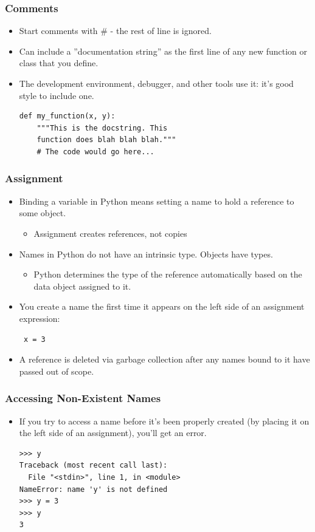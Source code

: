 \documentclass[12pt,handout]{beamer}
\begin{document}
\begin{frame}[fragile]
\frametitle{Comments}

\begin{itemize}
\item Start comments with \# - the rest of line is ignored.
\item Can include a ''documentation string'' as the first line of any
new function or class that you define.
\item The development environment, debugger, and other tools use
it: it's good style to include one.
\small{
\begin{verbatim}
def my_function(x, y):
    """This is the docstring. This
    function does blah blah blah."""
    # The code would go here...
\end{verbatim}
}
\end{itemize}
\end{frame}

\begin{frame}[fragile]
\frametitle{Assignment}

\begin{itemize}
\item Binding a variable in Python means setting a name to hold a
reference to some object.
\begin{itemize}
\item Assignment creates references, not copies
\end{itemize}
\item Names in Python do not have an intrinsic type. Objects have
types.
\begin{itemize}
\item Python determines the type of the reference automatically based on the
data object assigned to it.
\end{itemize}
\item You create a name the first time it appears on the left side of
an assignment expression:
\small{
\begin{verbatim}
 x = 3
\end{verbatim}
}
\item A reference is deleted via garbage collection after any names
bound to it have passed out of scope.
\end{itemize}
\end{frame}

\begin{frame}[fragile]
\frametitle{Accessing Non-Existent Names}
\begin{itemize}
\item If you try to access a name before it's been properly created
(by placing it on the left side of an assignment), you'll get an
error.
\small{
\begin{verbatim}
>>> y
Traceback (most recent call last):
  File "<stdin>", line 1, in <module>
NameError: name 'y' is not defined
>>> y = 3
>>> y
3
\end{verbatim}
}
\end{itemize}
\end{frame}
\end{document}
